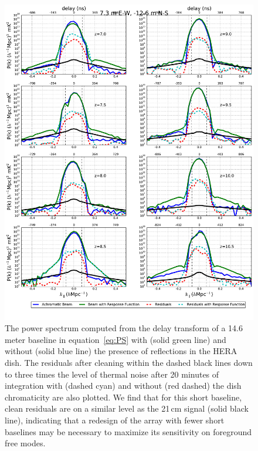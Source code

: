 \documentclass[twocolumn]{emulateapj}
\begin{document}
\begin{figure}
\includegraphics[width=\textwidth]{figures/ps_compare_nithya_lst4hr_1024ch_7p3ew_12p6ns.pdf}
\caption{The power spectrum computed from the delay transform of a 14.6 meter baseline in equation~\ref{eq:PS} with (solid green line) and without (solid blue line) the presence of reflections in the HERA dish. The residuals after cleaning within the dashed black lines down to three times the level of thermal noise after 20 minutes of integration with (dashed cyan) and without (red dashed) the dish chromaticity are also plotted. We find that for this short baseline, clean residuals are on a similar level as the 21\,cm signal (solid black line), indicating that a redesign of the array with fewer short baselines may be necessary to maximize its sensitivity on foreground free modes.}
\label{figure:shortBaseline}
\end{figure}
\end{document}
